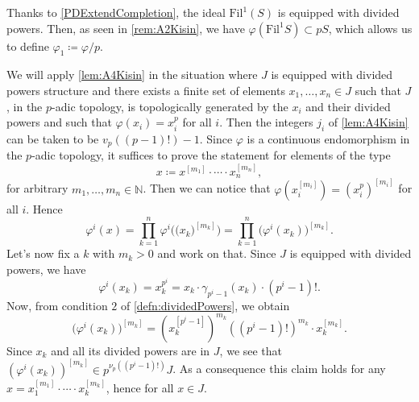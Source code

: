 \begin{ntt}[]\label{not:phi1S}
	Thanks to \cref{PDExtendCompletion}, the ideal 
	$\mathrm{Fil}^1(S)$ is equipped with divided powers.
	Then, as seen in \cref{rem:A2Kisin}, 
	we have $\varphi( \mathrm{Fil}^1 S) \subset p S$, which
	allows us to define $\varphi_1 \coloneqq \varphi/p$.
\end{ntt}


\begin{rem}[]\label{rem:j_iTheoremA6}
	We will apply \cref{lem:A4Kisin} in the situation where $J$ is equipped
	with divided powers structure and there exists a finite set of 
	elements $x_1, \ldots, x_n \in J$ such that $J$, in the $p$-adic topology, 
	is topologically generated by the $x_i$ and their divided powers
	and such that $\varphi(x_i) = x_i^p$ for all $i$.
	Then the integers $j_i$ of \cref{lem:A4Kisin} can
	be taken to be $v_p \left( (p-1)! \right) - 1$.
	Since $\varphi$ is a continuous endomorphism in the $p$-adic topology,
	it suffices to prove the statement for elements of the type
	\begin{equation*}
	x \coloneqq x^{[m_1]} \cdot \cdots \cdot x_n^{[m_n]}
	,\end{equation*}
	for arbitrary $m_1, \ldots, m_n \in \mathbb{N}$.
	Then we can notice that $\varphi(x_i^{[m_i]}) = \left( x_i^p \right)^{[m_i]}$
	for all $i$.
	Hence
	\begin{equation*}
		\varphi^i (x) = 
		\prod_{k = 1}^n \varphi^i \Big(\big( x_k \big)^{[m_k]}\Big) =
		\prod_{k = 1}^n 
		\big( \varphi^i(x_k) \big)^{[m_k]}
	.\end{equation*}
	Let's now fix a $k$ with $m_k > 0$ and work on that.
	Since $J$ is equipped with divided powers, we have
	\begin{equation*}
		\varphi^i(x_k) =
		x_k^{p^i} =
		x_k \cdot \gamma_{p^i-1}(x_k) \cdot (p^i-1)!
	.\end{equation*}
	Now, from condition $2$ of \cref{defn:dividedPowers}, we obtain
	\begin{equation*}
		\big( \varphi^i(x_k) \big)^{[m_k]} =
		\left( x_k^{[p^i-1]} \right)^{m_k}
		(\left( p^i - 1 \right)!)^{m_k} \cdot x_k^{[m_k]}
	.\end{equation*}
	Since $x_k$ and all its divided powers are in $J$,
	we see that $(\varphi^i(x_k))^{[m_k]} \in p^{\nu_p((p^i-1)!)}J$.
	As a consequence this claim holds for any 
	$x = x_1^{[m_1]} \cdot \cdots \cdot x_k^{[m_k]}$, hence for all $x \in J$.
\end{rem}


